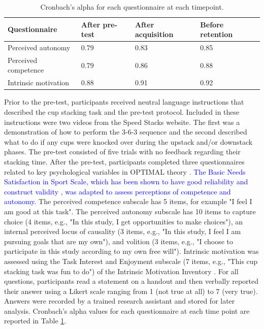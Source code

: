 \documentclass[man,floatsintext,donotrepeattitle,letterpaper,12pt]{apa7}
\begin{document}
\begin{table}[htb]
    \caption{Cronbach's alpha for each questionnaire at each timepoint.}
    \label{tab:table1}
    \small
    \begin{tabular}{@{}llll@{}}
    \toprule
    Questionnaire        & After pre-test & After acquisition & Before retention \\
    \midrule
    Perceived autonomy   & 0.79           & 0.83              & 0.85             \\
    Perceived competence & 0.79           & 0.86              & 0.88             \\
    Intrinsic motivation & 0.88           & 0.91              & 0.92             \\
    \bottomrule
    \end{tabular}
\end{table}

Prior to the pre-test, participants received neutral language instructions that described the cup stacking task and the pre-test protocol. Included in these instructions were two videos from the Speed Stacks website. The first was a demonstration of how to perform the 3-6-3 sequence and the second described what to do if any cups were knocked over during the upstack and/or downstack phases. The pre-test consisted of five trials with no feedback regarding their stacking time. After the pre-test, participants completed three questionnaires related to key psychological variables in OPTIMAL theory \autocite{wulf2016}. \textcolor{blue}{The Basic Needs Satisfaction in Sport Scale, which has been shown to have good reliability and construct validity \autocite{ng2011}, was adapted to assess perceptions of competence and autonomy.} The perceived competence subscale has 5 items, for example "I feel I am good at this task". The perceived autonomy subscale has 10 items to capture choice (4 items, e.g., "In this study, I get opportunities to make choices"), an internal perceived locus of causality (3 items, e.g., "In this study, I feel I am pursuing goals that are my own"), and volition (3 items, e.g., "I choose to participate in this study according to my own free will"). Intrinsic motivation was assessed using the Task Interest and Enjoyment subscale (7 items, e.g., "This cup stacking task was fun to do") of the Intrinsic Motivation Inventory \autocite{mcauley1989}. For all questions, participants read a statement on a handout and then verbally reported their answer using a Likert scale ranging from 1 (not true at all) to 7 (very true). Answers were recorded by a trained research assistant and stored for later analysis. Cronbach's alpha values for each questionnaire at each time point are reported in Table \ref{tab:table1}.
\end{document}
